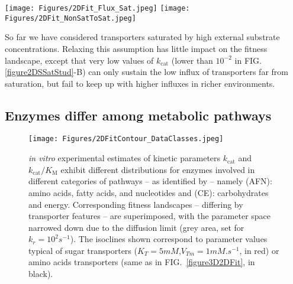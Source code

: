 \documentclass[11pt,onecolumn]{article}
\newcommand{\othercaption}[1]{\caption{\setlength{\baselineskip}{1.5\baselineskip}#1}}
\begin{document}
\begin{figure*}[h!]
\centering

\texttt{[image: Figures/2DFit\_Flux\_Sat.jpeg]}
\texttt{[image: Figures/2DFit\_NonSatToSat.jpeg]}
\caption{Features of a transporter have an impact on the flux landscape for upstream enzymes, as shown by the $0.9$ isoclines -- above which the relative flux is $>90\%$ -- that delineate the fitness plateau for each set of parameter. A: low ($K_T=0.1M$) and high ($10\mu M$) transporter affinities are considered, in combination with low ($V_{Tm}=10^{-6} M$), moderate ($10^{-4.5} M$) or high maximum flux ($10^{-3} M$). Increasing $K_T$ extends the plateau only towards the left part of the landscape, allowing enzymes with lower $k_f$ on the plateau, whereas decreasing $V_{Tm}$ extends the plateau in both directions. B: the shape of the fitness plateau is however little dependent on the saturation of the transporter, for a transporter with moderate flux ($V_{Tm}=10^{-4.5}M.s^{-1}$; the effect is identical for higher $V_{Tm}$, see SM Fig. S2). Other parameter values: $k_r=1000/s$, $[E_{tot}]=1mM$ and $[S_{env}]=10 \times K_T$.}
\label{figure2DSSatStud}
\end{figure*}

So far we have considered transporters saturated by high external substrate concentrations. Relaxing this assumption has little impact on the fitness landscape, except that very low values of $k_\text{cat}$ (lower than $10^{-2}$ in FIG. \ref{figure2DSSatStud}-B) can only sustain the low influx of transporters far from saturation, but fail to keep up with higher influxes in richer environments. 

\subsection{Enzymes differ among metabolic pathways}

\begin{figure}[h!]
\centering
\texttt{[image: Figures/2DFitContour\_DataClasses.jpeg]}  
\othercaption{\textit{in vitro} experimental estimates of kinetic parameters $k_\text{cat}$ and $k_\text{cat}/K_\text{M}$ exhibit different distributions for enzymes involved in different categories of pathways -- as identified by \citet{Bar-Even11} -- namely (AFN): amino acids, fatty acids, and nucleotides and (CE): carbohydrates and energy. Corresponding fitness landscapes -- differing by transporter features -- are superimposed, with the parameter space narrowed down due to the diffusion limit (grey area, set for $k_r=10^2 s^{-1}$). The isoclines shown correspond to parameter values typical of sugar transporters ($K_T=5mM$,$V_{Tm}=1mM.s^{-1}$, in red) \citep{Maier02} or amino acids transporters (same as in FIG.~\ref{figure3D2DFit}, in black).}
\label{figure2D_BarEven_Dataset}
\end{figure}
\end{document}
